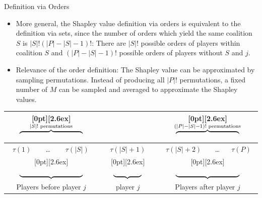 \documentclass[aspectratio=169]{../latex_main/tntbeamer}  %
\begin{document}
\begin{frame}{Definition via Orders}
  
\begin{itemize}
  \item More general, the Shapley value definition via orders is equivalent to the definition via sets, since the number of orders which yield the same coalition $S$ is  $|S|!(|P| - |S| - 1)!$: There are $|S|!$ possible orders of players within coalition $S$ and $(|P| - |S| - 1)!$ possible orders of players without $S$ and $j$.
  \pause
  \item Relevance of the order definition: The Shapley value can be approximated by sampling permutations. Instead of producing all $|P|!$ permutations, a fixed number of $M$ can be sampled and averaged to approximate the Shapley values.
\end{itemize}

  \begin{tabular}{|c|c|c|c|c|c|c|}
    \multicolumn{3}{c}{\enspace\raisebox{-3.3ex}[0pt][2.6ex]{$ \overbrace{\vphantom{-}\hspace{9em}}^{|S|! \text{ permutations}}$}} &
    \multicolumn{1}{c}{} & 
    \multicolumn{3}{c}{\enspace\raisebox{-3.3ex}[0pt][2.6ex]{$ \overbrace{\vphantom{-}\hspace{9em}}^{(|P| - |S| - 1)! \text{ permutations}}$}}\\
    \hline
    $\tau(1)$ & \ldots & $\tau(|S|)$ & $\tau(|S| + 1)$ & $\tau(|S| + 2)$ & \ldots & $\tau(P)$ \\
    \hline
    \multicolumn{3}{c}{\enspace\raisebox{1.3ex}[0pt][2.6ex]{$ \underbrace{\vphantom{-}\hspace{9em}}^{}$}} &
    \multicolumn{1}{c}{\enspace\raisebox{1.3ex}[0pt][2.6ex]{$ \underbrace{\vphantom{-}\hspace{4em}}^{}$}} & 
    \multicolumn{3}{c}{\enspace\raisebox{1.3ex}[0pt][2.6ex]{$ \underbrace{\vphantom{-}\hspace{9em}}^{}$}}\\
    \multicolumn{3}{c}{Players before player $j$} & \multicolumn{1}{c}{player $j$} & \multicolumn{3}{c}{Players after player $j$} \\
  \end{tabular}


\end{frame}
\end{document}
